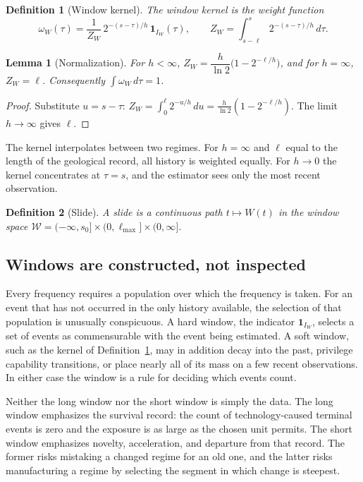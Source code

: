 \documentclass[11pt]{article}
\newtheorem{definition}{Definition}[section]
\newtheorem{lemma}{Lemma}[section]
\theoremstyle{remark}
\begin{document}
\begin{definition}[Window kernel]\label{def:kernel}
The \emph{window kernel} is the weight function
\begin{equation}
\omega_W(\tau)=\frac{1}{Z_W}\,2^{-(s-\tau)/h}\,\mathbf{1}_{I_W}(\tau),\qquad
Z_W=\int_{s-\ell}^{s}2^{-(s-\tau)/h}\,d\tau .
\end{equation}
\end{definition}

\begin{lemma}[Normalization]\label{lem:norm}
For $h<\infty$, $Z_W=\dfrac{h}{\ln 2}\bigl(1-2^{-\ell/h}\bigr)$, and for $h=\infty$, $Z_W=\ell$. Consequently $\int\omega_W\,d\tau=1$.
\end{lemma}
\begin{proof}
Substitute $u=s-\tau$: $Z_W=\int_0^{\ell}2^{-u/h}\,du=\frac{h}{\ln 2}(1-2^{-\ell/h})$. The limit $h\to\infty$ gives $\ell$. \qedhere
\end{proof}

The kernel interpolates between two regimes. For $h=\infty$ and $\ell$ equal to the length of the geological record, all history is weighted equally. For $h\to 0$ the kernel concentrates at $\tau=s$, and the estimator sees only the most recent observation.

\begin{definition}[Slide]\label{def:slide}
A \emph{slide} is a continuous path $t\mapsto W(t)$ in the window space $\mathcal{W}=(-\infty,s_0]\times(0,\ell_{\max}]\times(0,\infty]$.
\end{definition}

\subsection{Windows are constructed, not inspected}

Every frequency requires a population over which the frequency is taken. For an event that has not occurred in the only history available, the selection of that population is unusually conspicuous. A hard window, the indicator $\mathbf{1}_{I_W}$, selects a set of events as commensurable with the event being estimated. A soft window, such as the kernel of Definition~\ref{def:kernel}, may in addition decay into the past, privilege capability transitions, or place nearly all of its mass on a few recent observations. In either case the window is a rule for deciding which events count.

Neither the long window nor the short window is simply the data. The long window emphasizes the survival record: the count of technology-caused terminal events is zero and the exposure is as large as the chosen unit permits. The short window emphasizes novelty, acceleration, and departure from that record. The former risks mistaking a changed regime for an old one, and the latter risks manufacturing a regime by selecting the segment in which change is steepest.
\end{document}
